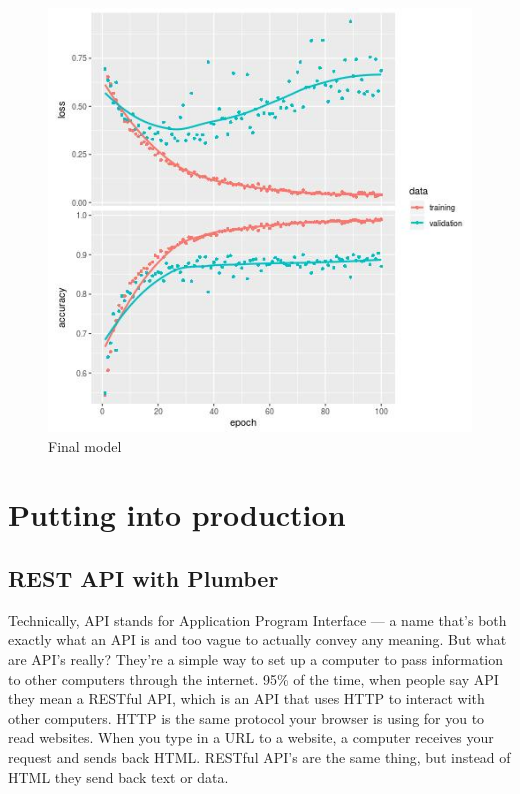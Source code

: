 \documentclass[]{book}
\begin{document}
\begin{figure}
\centering
\includegraphics{history-CNN-augmented-pretrained-fine-tunning.jpg}
\caption{Final model}
\end{figure}

\clearpage

\hypertarget{putting-into-production}{%
\chapter{Putting into production}\label{putting-into-production}}

\hypertarget{rest-api-with-plumber}{%
\section{REST API with Plumber}\label{rest-api-with-plumber}}

Technically, API stands for Application Program Interface --- a name that's both exactly what an API is and too vague to actually convey any meaning. But what are API's really? They're a simple way to set up a computer to pass information to other computers through the internet. 95\% of the time, when people say API they mean a RESTful API, which is an API that uses HTTP to interact with other computers. HTTP is the same protocol your browser is using for you to read websites. When you type in a URL to a website, a computer receives your request and sends back HTML. RESTful API's are the same thing, but instead of HTML they send back text or data.
\end{document}
